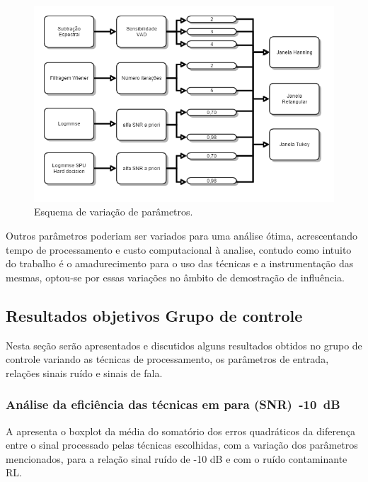 \begin{figure}[H]
\centering
\includegraphics[width=16cm]{Figs/parametros}
\caption{Esquema de variação de parâmetros.}
\label{figParametros}
\end{figure}

Outros parâmetros poderiam ser variados para uma análise ótima, acrescentando tempo de processamento e custo computacional à analise, contudo como intuito do trabalho é o amadurecimento para o uso das técnicas e a instrumentação das mesmas, optou-se por essas variações no âmbito de demostração de influência.


\subsection{Resultados objetivos Grupo de controle}
Nesta seção serão apresentados e discutidos alguns resultados obtidos no grupo de controle variando as técnicas de processamento, os parâmetros de entrada, relações sinais ruído e sinais de fala.

\subsubsection{Análise da eficiência das técnicas em para (SNR)~-10~dB}


A  apresenta o boxplot da média do somatório dos erros quadráticos da diferença entre o sinal processado pelas técnicas escolhidas, com a variação dos parâmetros mencionados, para a relação sinal ruído de -10 dB e com o ruído contaminante RL.

